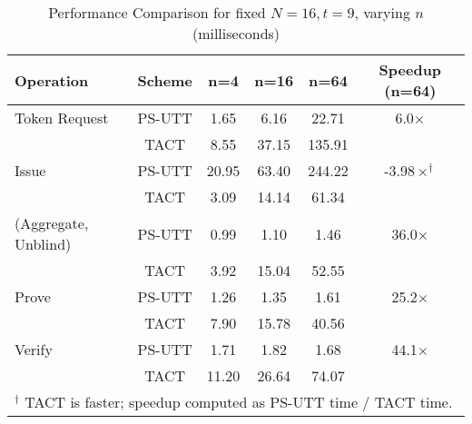\begin{table}[!htbp]
\centering
\caption[Threshold ABC Performance Comparison, fixed number of nodes, varying attribute length]{Performance Comparison for fixed $ N = 16, t = 9 $, varying $n$ (milliseconds)}
\begin{tabular}{lccccc}
\toprule
\textbf{Operation} & \textbf{Scheme} & \textbf{n=4} & \textbf{n=16} & \textbf{n=64} & \textbf{Speedup (n=64)} \\
\midrule
Token Request & PS-UTT & 1.65 & 6.16 & 22.71 & 6.0$\times$ \\
              & TACT   & 8.55 & 37.15 & 135.91 & \\
\midrule
Issue         & PS-UTT & 20.95 & 63.40 & 244.22 & -3.98$\times^\dagger$ \\
              & TACT   & 3.09 & 14.14 & 61.34 & \\
\midrule
(Aggregate, Unblind) & PS-UTT & 0.99 & 1.10 & 1.46 & 36.0$\times$ \\
                     & TACT   & 3.92 & 15.04 & 52.55 & \\
\midrule
Prove         & PS-UTT & 1.26 & 1.35 & 1.61 & 25.2$\times$ \\
              & TACT   & 7.90 & 15.78 & 40.56 & \\
\midrule
Verify        & PS-UTT & 1.71 & 1.82 & 1.68 & 44.1$\times$ \\
              & TACT   & 11.20 & 26.64 & 74.07 & \\
\bottomrule
\multicolumn{6}{l}{\small $^\dagger$ TACT is faster; speedup computed as PS-UTT time / TACT time.}
\end{tabular}
\label{tab:perf-comp-vary-n}
\end{table}


